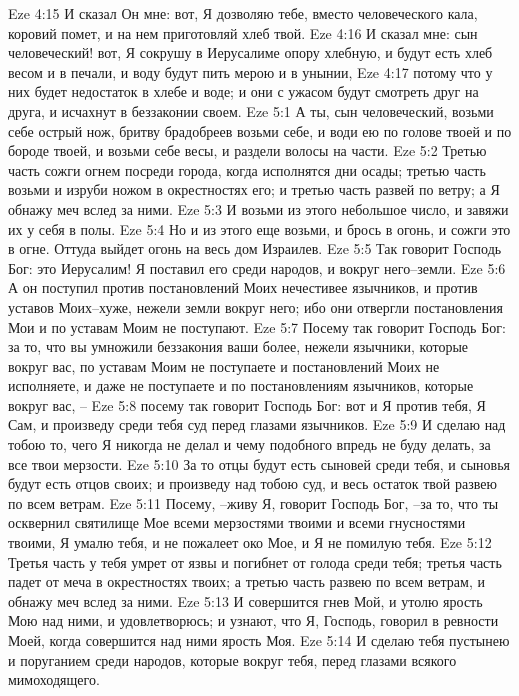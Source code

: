 Eze 4:15  И сказал Он мне: вот, Я дозволяю тебе, вместо человеческого кала, коровий помет, и на нем приготовляй хлеб твой.
Eze 4:16  И сказал мне: сын человеческий! вот, Я сокрушу в Иерусалиме опору хлебную, и будут есть хлеб весом и в печали, и воду будут пить мерою и в унынии,
Eze 4:17  потому что у них будет недостаток в хлебе и воде; и они с ужасом будут смотреть друг на друга, и исчахнут в беззаконии своем.
Eze 5:1  А ты, сын человеческий, возьми себе острый нож, бритву брадобреев возьми себе, и води ею по голове твоей и по бороде твоей, и возьми себе весы, и раздели волосы на части.
Eze 5:2  Третью часть сожги огнем посреди города, когда исполнятся дни осады; третью часть возьми и изруби ножом в окрестностях его; и третью часть развей по ветру; а Я обнажу меч вслед за ними.
Eze 5:3  И возьми из этого небольшое число, и завяжи их у себя в полы.
Eze 5:4  Но и из этого еще возьми, и брось в огонь, и сожги это в огне. Оттуда выйдет огонь на весь дом Израилев.
Eze 5:5  Так говорит Господь Бог: это Иерусалим! Я поставил его среди народов, и вокруг него--земли.
Eze 5:6  А он поступил против постановлений Моих нечестивее язычников, и против уставов Моих--хуже, нежели земли вокруг него; ибо они отвергли постановления Мои и по уставам Моим не поступают.
Eze 5:7  Посему так говорит Господь Бог: за то, что вы умножили беззакония ваши более, нежели язычники, которые вокруг вас, по уставам Моим не поступаете и постановлений Моих не исполняете, и даже не поступаете и по постановлениям язычников, которые вокруг вас, --
Eze 5:8  посему так говорит Господь Бог: вот и Я против тебя, Я Сам, и произведу среди тебя суд перед глазами язычников.
Eze 5:9  И сделаю над тобою то, чего Я никогда не делал и чему подобного впредь не буду делать, за все твои мерзости.
Eze 5:10  За то отцы будут есть сыновей среди тебя, и сыновья будут есть отцов своих; и произведу над тобою суд, и весь остаток твой развею по всем ветрам.
Eze 5:11  Посему, --живу Я, говорит Господь Бог, --за то, что ты осквернил святилище Мое всеми мерзостями твоими и всеми гнусностями твоими, Я умалю тебя, и не пожалеет око Мое, и Я не помилую тебя.
Eze 5:12  Третья часть у тебя умрет от язвы и погибнет от голода среди тебя; третья часть падет от меча в окрестностях твоих; а третью часть развею по всем ветрам, и обнажу меч вслед за ними.
Eze 5:13  И совершится гнев Мой, и утолю ярость Мою над ними, и удовлетворюсь; и узнают, что Я, Господь, говорил в ревности Моей, когда совершится над ними ярость Моя.
Eze 5:14  И сделаю тебя пустынею и поруганием среди народов, которые вокруг тебя, перед глазами всякого мимоходящего.
